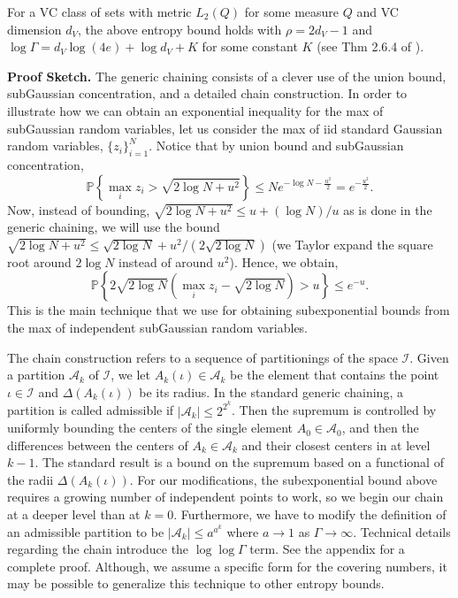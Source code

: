 \begin{remark}
For a VC class of sets with metric $L_2(Q)$ for some measure $Q$ and VC dimension $d_V$, the above entropy bound holds with $\rho = 2d_V - 1$ and $\log \Gamma = d_V \log (4e) + \log d_V + K$ for some constant $K$ (see Thm 2.6.4 of \cite{van1996weak}). 
\end{remark}

\noindent
{\bf Proof Sketch.} The generic chaining consists of a clever use of the union bound, subGaussian concentration, and a detailed chain construction.
In order to illustrate how we can obtain an exponential inequality for the max of subGaussian random variables, let us consider the max of iid standard Gaussian random variables, $\{z_i\}_{i=1}^N$.
Notice that by union bound and subGaussian concentration,
$$
\mathbb P \left\{ \max_i z_i > \sqrt{2 \log N + u^2} \right\} %
\le N e^{-\log N - \frac{u^2}{2}} = e^{-\frac{u^2}{2}}.
$$
Now, instead of bounding, $\sqrt{2 \log N + u^2} \le u + (\log N) / u$ as is done in the generic chaining, we will use the bound $\sqrt{2 \log N + u^2} \le \sqrt{2 \log N} + u^2 / (2 \sqrt{2 \log N})$ (we Taylor expand the square root around $2 \log N$ instead of around $u^2$).
Hence, we obtain,
$$
\mathbb P \left\{ 2 \sqrt{2 \log N} \left( \max_i z_i - \sqrt{2 \log N} \right) > u \right\} \le e^{-u}.
$$
This is the main technique that we use for obtaining subexponential bounds from the max of independent subGaussian random variables.

The chain construction refers to a sequence of partitionings of the space $\mathcal I$.  
Given a partition $\mathcal A_k$ of $\mathcal I$, we let $A_k(\iota) \in \mathcal A_k$ be the element that contains the point $\iota \in \mathcal I$ and $\Delta(A_k(\iota))$ be its radius.
In the standard generic chaining, a partition is called admissible if $|\mathcal A_k| \le 2^{2^k}$.
Then the supremum is controlled by uniformly bounding the centers of the single element $A_0 \in \mathcal A_0$, and then the differences between the centers of $A_{k} \in \mathcal A_k$ and their closest centers in at level $k-1$.
The standard result is a bound on the supremum based on a functional of the radii $\Delta(A_k(\iota))$.
For our modifications, the subexponential bound above requires a growing number of independent points to work, so we begin our chain at a deeper level than at $k=0$.
Furthermore, we have to modify the definition of an admissible partition to be $|\mathcal A_k| \le a^{a^k}$ where $a \rightarrow 1$ as $\Gamma \rightarrow \infty$.
Technical details regarding the chain introduce the $\log \log \Gamma$ term.
See the appendix for a complete proof.
Although, we assume a specific form for the covering numbers, it may be possible to generalize this technique to other entropy bounds.

